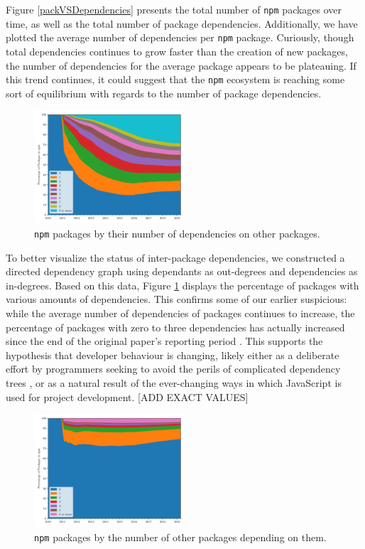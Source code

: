 \documentclass[10pt,conference]{IEEEtran}
\def\code#1{\texttt{#1}}
\begin{document}
Figure \ref{packVSDependencies} presents the total number of \code{npm} packages over time, 
as well as the total number of package dependencies. Additionally, we have plotted
the average number of dependencies per \code{npm} package. Curiously, though total dependencies
continues to grow faster than the creation of new packages, the number of dependencies 
for the average package appears to be plateauing. If this trend continues, it could suggest
that the \code{npm} ecosystem is reaching some sort of equilibrium with regards to the number
of package dependencies.

\begin{figure}
  \includegraphics[width=0.5\textwidth]{figures/npm_deps_monthly_out_degree.pdf}
  \caption{\code{npm} packages by their number of dependencies on other packages.}
  \label{outDegree}
\end{figure}

To better visualize the status of inter-package dependencies, we constructed
a directed dependency graph using dependants as out-degrees and
dependencies as in-degrees. Based on this data, Figure \ref{outDegree}
displays the percentage of packages with various amounts of dependencies. 
This confirms some of our earlier suspicious: while the average number of dependencies 
of packages continues to increase, the percentage of packages with zero 
to three dependencies has actually increased since the end of the original paper's
reporting period \cite{Wittern:2016}. This supports the hypothesis that developer 
behaviour is changing, likely either as a deliberate effort by programmers seeking to avoid the perils of 
complicated dependency trees \cite{Kikas:2017}, or as a natural result of the ever-changing
ways in which JavaScript is used for project development. [ADD EXACT VALUES]

\begin{figure}
  \includegraphics[width=0.5\textwidth]{figures/npm_deps_monthly_in_degree.pdf}
  \caption{\code{npm} packages by the number of other packages depending on them.}
  \label{inDegree}
\end{figure}
\end{document}
